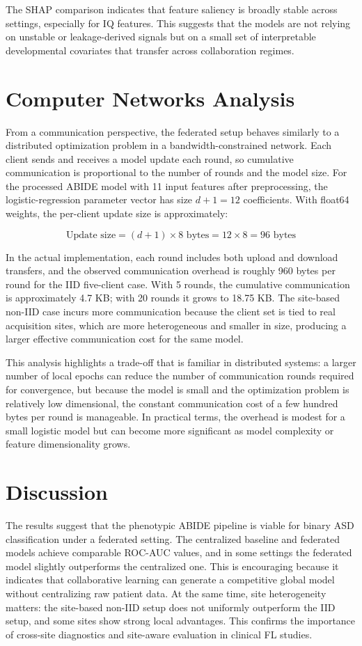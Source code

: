 \documentclass[sigconf]{acmart}
\begin{document}
The SHAP comparison indicates that feature saliency is broadly stable across settings, especially for IQ features. This suggests that the models are not relying on unstable or leakage-derived signals but on a small set of interpretable developmental covariates that transfer across collaboration regimes.

\section{Computer Networks Analysis}
From a communication perspective, the federated setup behaves similarly to a distributed optimization problem in a bandwidth-constrained network. Each client sends and receives a model update each round, so cumulative communication is proportional to the number of rounds and the model size. For the processed ABIDE model with 11 input features after preprocessing, the logistic-regression parameter vector has size $d + 1 = 12$ coefficients. With float64 weights, the per-client update size is approximately:

\begin{equation}
\text{Update size} = (d + 1) \times 8 \text{ bytes} = 12 \times 8 = 96 \text{ bytes}
\end{equation}

In the actual implementation, each round includes both upload and download transfers, and the observed communication overhead is roughly 960 bytes per round for the IID five-client case. With 5 rounds, the cumulative communication is approximately 4.7 KB; with 20 rounds it grows to 18.75 KB. The site-based non-IID case incurs more communication because the client set is tied to real acquisition sites, which are more heterogeneous and smaller in size, producing a larger effective communication cost for the same model.

This analysis highlights a trade-off that is familiar in distributed systems: a larger number of local epochs can reduce the number of communication rounds required for convergence, but because the model is small and the optimization problem is relatively low dimensional, the constant communication cost of a few hundred bytes per round is manageable. In practical terms, the overhead is modest for a small logistic model but can become more significant as model complexity or feature dimensionality grows.

\section{Discussion}
The results suggest that the phenotypic ABIDE pipeline is viable for binary ASD classification under a federated setting. The centralized baseline and federated models achieve comparable ROC-AUC values, and in some settings the federated model slightly outperforms the centralized one. This is encouraging because it indicates that collaborative learning can generate a competitive global model without centralizing raw patient data. At the same time, site heterogeneity matters: the site-based non-IID setup does not uniformly outperform the IID setup, and some sites show strong local advantages. This confirms the importance of cross-site diagnostics and site-aware evaluation in clinical FL studies.
\end{document}
